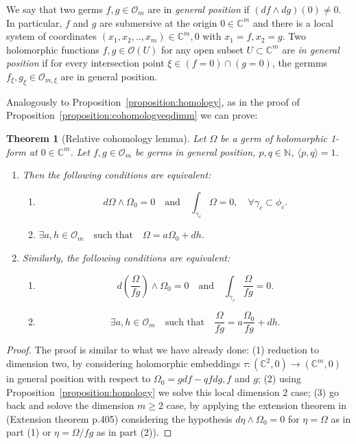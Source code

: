 \documentclass[11pt,a4paper]{amsart}
\newtheorem{theorem}{Theorem}[section]
\theoremstyle{definition}
\begin{document}
We say that two germs $f,g\in\mathcal{O}_m$ are in \emph{general position} if
$(df\wedge dg)(0)\neq 0$.
In particular, $f$ and $g$ are submersive at the origin $0\in \mathbb{C}^m$ and there is a local system of coordinates 
 $(x_1,x_2,..,x_m)\in \mathbb C^m,0$ with $x_1=f, x_2=g$. Two holomorphic functions 
 $f, g \in \mathcal O(U)$ for any open subset $U\subset \mathbb C^m$ are {\it in general position}
 if for every intersection point $\xi \in (f=0)\cap (g=0)$, the germms $f_\xi, g_\xi \in \mathcal O_{m, \xi}$ are in general position.  


Analogously to Proposition~\ref{proposition:homology}, as in the proof of Proposition~\ref{proposition:cohomologyeqdimm} we can prove:
\begin{theorem}[Relative cohomology lemma]

Let \(\Omega \) be a germ of holomorphic 1-form at \(0 \in \mathbb C^m\).
Let \(f,g \in \mathcal O_m\) be germs in general position,
\(p,q \in \mathbb N\), \(\langle p,q \rangle = 1\).
\begin{enumerate}

\item Then the following conditions are equivalent:
\begin{enumerate}
\item
\[
d\Omega \wedge \Omega_0 = 0
\quad \text{and} \quad
\int_{\gamma_c} \Omega = 0,
\quad \forall \gamma_c \subset \phi_c.
\]

\item 
$\exists a,h \in \mathcal O_m
\quad \text{such that} \quad
\Omega = a \Omega_0 + dh.
$
\end{enumerate}

\item Similarly, the following conditions are equivalent:
\begin{enumerate}
\item 
\[
d\!\left(\frac{\Omega}{fg}\right) \wedge \Omega_0 = 0
\quad \text{and} \quad
\int_{\gamma_c} \frac{\Omega}{fg} = 0.
\]

\item
\[
\exists a,h \in \mathcal O_m
\quad \text{such that} \quad
\frac{\Omega}{fg}
=
a \frac{\Omega_0}{fg}
+ dh.
\]
\end{enumerate}
\end{enumerate}
\end{theorem}

\begin{proof}
The proof is similar to what we have already done: (1) reduction to dimension two, by  considering 
holomorphic embeddings $\tau \colon (\mathbb C^2, 0) \to (\mathbb C^m,0)$ in general position with respect to 
$\Omega_0=gdf - q f dg, f$ and $g$; (2) using Proposition~\ref{proposition:homology} we solve this local dimension $2$ case; (3) go back and solove the dimension $m \geq 2$ case, by applying  the extension theorem 
in \cite{[Cerveau--Berthier]}(Extension theorem p.405) considering the hypothesis $d \eta \wedge \Omega_0=0$ for $\eta=\Omega$ as in part (1) or $\eta=\Omega/fg$ as in part (2)).

\end{proof}
\end{document}
